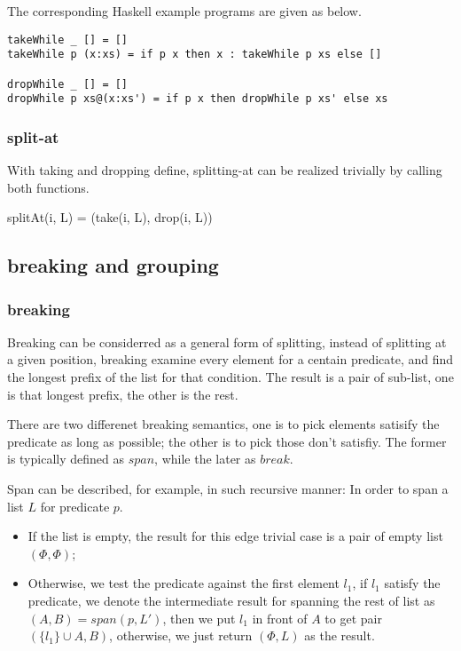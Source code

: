 \documentclass{article}
\begin{document}
The corresponding Haskell example programs are given as below.

\lstset{language=Haskell}
\begin{lstlisting}
takeWhile _ [] = []
takeWhile p (x:xs) = if p x then x : takeWhile p xs else []

dropWhile _ [] = []
dropWhile p xs@(x:xs') = if p x then dropWhile p xs' else xs
\end{lstlisting}

\subsubsection{split-at}

With taking and dropping define, splitting-at can be realized trivially by calling both functions.

\be
splitAt(i, L) = (take(i, L), drop(i, L))
\ee

\subsection{breaking and grouping}

\subsubsection{breaking}

Breaking can be considerred as a general form of splitting, instead of splitting at a given position, breaking
examine every element for a centain predicate, and find the longest prefix of the list for that condition. 
The result is a pair of sub-list, one is that longest prefix, the other is the rest.

There are two differenet breaking semantics, one is to pick elements satisify the predicate as long as possible;
the other is to pick those don't satisfiy. The former is typically defined as $span$, while the later as $break$.

Span can be described, for example, in such recursive manner: In order to span a list $L$ for predicate $p$.

\begin{itemize}
\item If the list is empty, the result for this edge trivial case is a pair of empty list $(\Phi, \Phi)$;
\item Otherwise, we test the predicate against the first element $l_1$, if $l_1$ satisfy the predicate, we 
denote the intermediate result for spanning the rest of list as $(A, B) = span(p, L')$, then
 we put $l_1$ in front of $A$ to get pair $(\{ l_1 \} \cup A, B)$, otherwise, we just return $(\Phi, L)$ as
the result.
\end{itemize}
\end{document}
